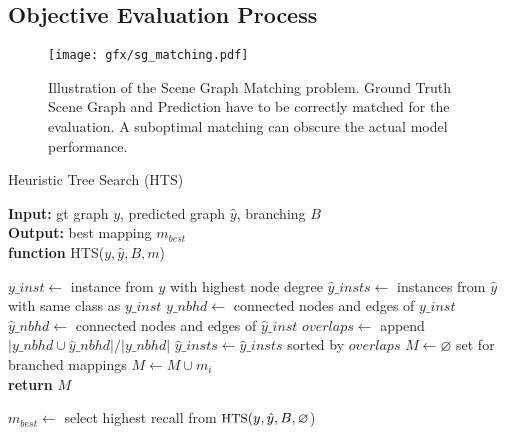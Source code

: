 \documentclass[10pt,twocolumn,letterpaper]{article}
\begin{document}
\subsection{Objective Evaluation Process}

\begin{figure*}[t]
  \centering
   \texttt{[image: gfx/sg\_matching.pdf]}
   \caption{Illustration of the Scene Graph Matching problem. Ground Truth Scene Graph and Prediction have to be correctly matched for the evaluation. A suboptimal matching can obscure the actual model performance.}
   \label{fig:sg_matching_problem}
\end{figure*}

\begin{algorithm}
\caption{Heuristic Tree Search (HTS)} 
\textbf{Input:} gt graph $y$, predicted graph $\hat{y}$, branching $B$\\
\textbf{Output:} best mapping $m_{best}$ \\
\textbf{function} HTS($y, \hat{y}, B, m$)
\begin{algorithmic}
\State $y\_inst \gets$ instance from $y$ with highest node degree
\State $\hat{y}\_insts \gets $ instances from $\hat{y}$ with same class as $y\_inst$
\State $y\_nbhd \gets$ connected nodes and edges of $y\_inst$
\State $\hat{y}\_nbhd \gets$ connected nodes and edges of $\hat{y}\_inst$
\State $overlaps \gets $ append $|y\_nbhd \cup \hat{y}\_nbhd| / |y\_nbhd|$
        \EndFor
    \State $\hat{y}\_insts \gets \hat{y}\_insts$ sorted by $overlaps$
        \State $M \gets \varnothing $  set for branched mappings 
         $M \gets M \cup m_i$
        \EndIf
   \EndFor\\
\textbf{return} $M$

\end{algorithmic}
$m_{best} \gets$ select highest recall from $\small\text{HTS}(y, \hat{y}, B, \varnothing$)
\label{tree_based_matching}
\end{algorithm}
\end{document}
